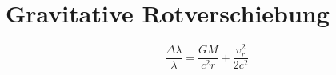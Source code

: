\section{Gravitative Rotverschiebung}
\[ \frac{\Delta \lambda}{\lambda} = \frac{GM}{c^2 r} + \frac{v_r^2}{2c^2} \]